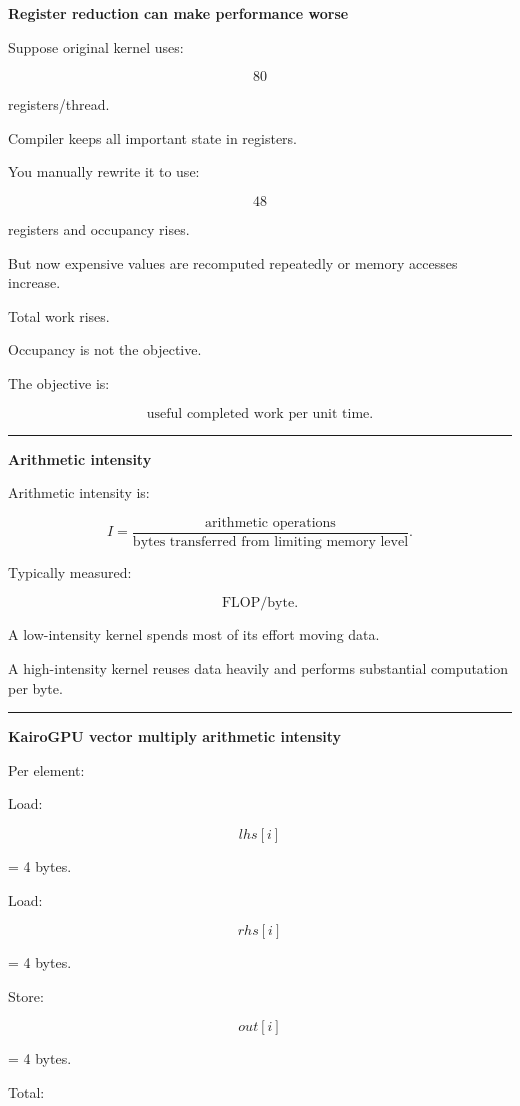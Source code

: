 \textbf{Register reduction can make performance worse}

Suppose original kernel uses:

\[
80
\]

registers/thread.

Compiler keeps all important state in registers.

You manually rewrite it to use:

\[
48
\]

registers and occupancy rises.

But now expensive values are recomputed repeatedly or memory accesses increase.

Total work rises.

Occupancy is not the objective.

The objective is:

\[
\boxed{
\text{useful completed work per unit time}.
}
\]

\begin{center}\rule{0.5\linewidth}{0.5pt}\end{center}

\textbf{Arithmetic intensity}

Arithmetic intensity is:

\[
\boxed{
I=
\frac{
\text{arithmetic operations}
}{
\text{bytes transferred from limiting memory level}
}.
}
\]

Typically measured:

\[
\text{FLOP/byte}.
\]

A low-intensity kernel spends most of its effort moving data.

A high-intensity kernel reuses data heavily and performs substantial computation per byte.

\begin{center}\rule{0.5\linewidth}{0.5pt}\end{center}

\textbf{KairoGPU vector multiply arithmetic intensity}

Per element:

Load:

\[
lhs[i]
\]

= 4 bytes.

Load:

\[
rhs[i]
\]

= 4 bytes.

Store:

\[
out[i]
\]

= 4 bytes.

Total:

